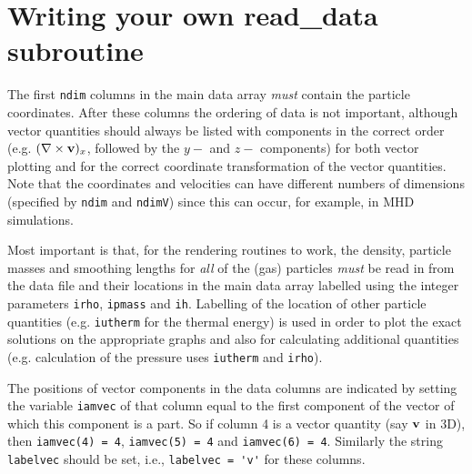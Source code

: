 \documentclass[a4paper,10pt]{article}
\begin{document}
\newpage

\section{Writing your own read\_data subroutine}%
\label{sec:writeyourown}
The first \verb+ndim+ columns in the main data array \emph{must} contain the particle coordinates.
After these columns the ordering of data is not important, although vector quantities should
always be listed with components in the correct order (e.g. $(\nabla\times {\bf v})_x$,
followed by the $y-$ and $z-$ components) for both vector plotting and for the
correct coordinate transformation of the vector quantities. Note that the coordinates and velocities can have different
numbers of dimensions (specified by \verb+ndim+ and \verb+ndimV+) since this can occur, for example, in MHD simulations.

Most important is that, for the rendering routines to work, the density, particle
masses and smoothing lengths for \emph{all} of the (gas) particles \emph{must} be read in from
the data file and their locations in the main data array labelled using the integer
parameters \verb+irho+, \verb+ipmass+ and \verb+ih+. Labelling of the location of other particle
quantities (e.g. \verb+iutherm+ for the thermal energy) is used in
order to plot the exact solutions on the appropriate graphs and also for calculating
additional quantities (e.g. calculation of the pressure uses \verb+iutherm+ and
\verb+irho+).

 The positions of vector components in the data columns are indicated by setting the variable \verb+iamvec+ of that
column equal to the first component of the vector of which this component is a part. So if column 4
is a vector quantity (say ${\bf v}$ in 3D), then \verb+iamvec(4) = 4+, \verb+iamvec(5) = 4+ and
\verb+iamvec(6) = 4+. Similarly the string \verb+labelvec+ should be set, i.e., \verb+labelvec = 'v'+ for these columns.


\end{document}
